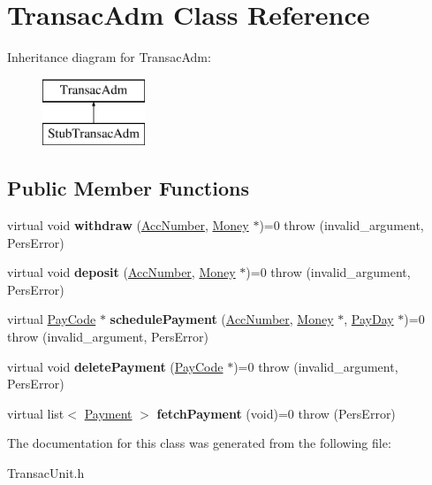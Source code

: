 \hypertarget{classTransacAdm}{\section{Transac\-Adm Class Reference}
\label{da/deb/classTransacAdm}
}
Inheritance diagram for Transac\-Adm\-:\begin{figure}[H]
\begin{center}
\leavevmode
\includegraphics[height=2.000000cm]{da/deb/classTransacAdm}
\end{center}
\end{figure}
\subsection*{Public Member Functions}
\begin{DoxyCompactItemize}
\item 
\hypertarget{classTransacAdm_a128750caeeec2cd48a4a01e6ce9f701c}{virtual void {\bfseries withdraw} (\hyperlink{classAccNumber}{Acc\-Number}, \hyperlink{classMoney}{Money} $\ast$)=0  throw (invalid\-\_\-argument, Pers\-Error)}\label{da/deb/classTransacAdm_a128750caeeec2cd48a4a01e6ce9f701c}

\item 
\hypertarget{classTransacAdm_a9b6ffc8a521600094eb13510edcb33d7}{virtual void {\bfseries deposit} (\hyperlink{classAccNumber}{Acc\-Number}, \hyperlink{classMoney}{Money} $\ast$)=0  throw (invalid\-\_\-argument, Pers\-Error)}\label{da/deb/classTransacAdm_a9b6ffc8a521600094eb13510edcb33d7}

\item 
\hypertarget{classTransacAdm_a6f350bc661f1a6460a31a0b02ccb8d3f}{virtual \hyperlink{classPayCode}{Pay\-Code} $\ast$ {\bfseries schedule\-Payment} (\hyperlink{classAccNumber}{Acc\-Number}, \hyperlink{classMoney}{Money} $\ast$, \hyperlink{classPayDay}{Pay\-Day} $\ast$)=0  throw (invalid\-\_\-argument, Pers\-Error)}\label{da/deb/classTransacAdm_a6f350bc661f1a6460a31a0b02ccb8d3f}

\item 
\hypertarget{classTransacAdm_a76f27b0fc9e604695c4c601839d3b441}{virtual void {\bfseries delete\-Payment} (\hyperlink{classPayCode}{Pay\-Code} $\ast$)=0  throw (invalid\-\_\-argument, Pers\-Error)}\label{da/deb/classTransacAdm_a76f27b0fc9e604695c4c601839d3b441}

\item 
\hypertarget{classTransacAdm_ab3c02884c14540c1f520339581e88371}{virtual list$<$ \hyperlink{classPayment}{Payment} $>$ {\bfseries fetch\-Payment} (void)=0  throw (\-Pers\-Error)}\label{da/deb/classTransacAdm_ab3c02884c14540c1f520339581e88371}

\end{DoxyCompactItemize}


The documentation for this class was generated from the following file\-:\begin{DoxyCompactItemize}
\item 
Transac\-Unit.\-h\end{DoxyCompactItemize}

